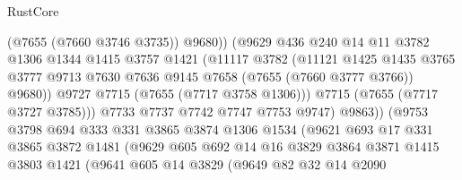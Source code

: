 \begin{lexlean}{RustCore}
\begin{coremodule}
                                (@7655 (@7660 @3746 @3735))
                                @9680))
                            (@9629
                              @436
                              @240
                              @14
                              @11
                              @3782
                              @1306
                              @1344
                              @1415
                              @3757
                              @1421
                              (@11117
                                @3782
                                (@11121
                                  @1425
                                  @1435
                                  @3765
                                  @3777
                                  @9713
                                  @7630
                                  @7636
                                  @9145
                                  @7658
                                  (@7655 (@7660 @3777 @3766))
                                  @9680))
                              @9727
                              @7715
                              (@7655 (@7717 @3758 @1306)))
                            @7715
                            (@7655 (@7717 @3727 @3785)))
                          @7733
                          @7737
                          @7742
                          @7747
                          @7753
                          @9747)
                        @9863))
                    (@9753
                      @3798
                      @694
                      @333
                      @331
                      @3865
                      @3874
                      @1306
                      @1534
                      (@9621
                        @693
                        @17
                        @331
                        @3865
                        @3872
                        @1481
                        (@9629
                          @605
                          @692
                          @14
                          @16
                          @3829
                          @3864
                          @3871
                          @1415
                          @3803
                          @1421
                          (@9641
                            @605
                            @14
                            @3829
                            (@9649
                              @82
                              @32
                              @14
                              @2090

\end{coremodule}
\end{lexlean}
